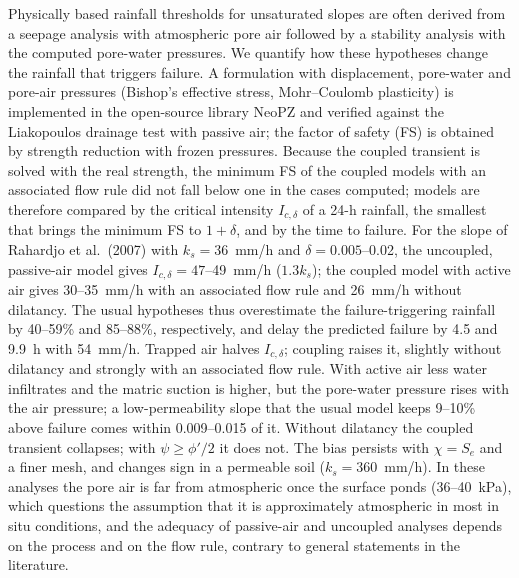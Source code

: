 Physically based rainfall thresholds for unsaturated slopes are often derived from a seepage analysis with atmospheric
pore air followed by a stability analysis with the computed pore-water pressures. We quantify how these hypotheses
change the rainfall that triggers failure. A formulation with displacement, pore-water and pore-air pressures
(Bishop's effective stress, Mohr--Coulomb plasticity) is implemented in the open-source library NeoPZ and verified
against the Liakopoulos drainage test with passive air; the factor of safety (FS) is obtained by strength reduction
with frozen pressures. Because the coupled transient is solved with the real strength, the minimum FS of the coupled
models with an associated flow rule did not fall below one in the cases computed; models are therefore compared by the critical intensity
$I_{c,\delta}$ of a 24-h rainfall, the smallest that brings the minimum FS to $1+\delta$, and by the time to failure.
For the slope of Rahardjo et al.\ (2007) with $k_s=36$~mm/h and $\delta=0.005$--0.02, the uncoupled, passive-air model
gives $I_{c,\delta}=47$--49~mm/h ($1.3k_s$); the coupled model with active air gives 30--35~mm/h with an associated
flow rule and 26~mm/h without dilatancy. The usual hypotheses thus overestimate the failure-triggering rainfall by
40--59\% and 85--88\%, respectively, and delay the predicted failure by 4.5 and 9.9~h with 54~mm/h. Trapped air
halves $I_{c,\delta}$; coupling raises it, slightly without dilatancy and strongly with an associated flow rule. With
active air less water infiltrates and the matric suction is higher, but the pore-water pressure rises with the air
pressure; a low-permeability slope that the usual model keeps 9--10\% above failure comes within 0.009--0.015 of it.
Without dilatancy the coupled transient collapses; with $\psi\ge\phi'/2$ it does not. The bias persists with
$\chi=S_e$ and a finer mesh, and changes sign in a permeable soil ($k_s=360$~mm/h). In these analyses the pore air
is far from atmospheric once the surface ponds (36--40~kPa), which questions the assumption that it is approximately
atmospheric in most in situ conditions, and the adequacy of passive-air and uncoupled analyses depends on the process
and on the flow rule, contrary to general statements in the literature.
